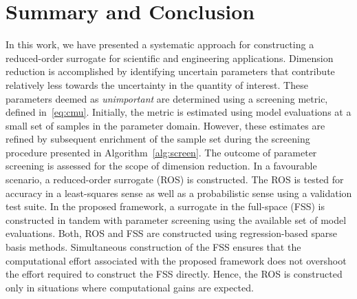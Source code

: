 \section{Summary and Conclusion}
\label{sec:disc}


In this work, we have presented a systematic approach for constructing a reduced-order
surrogate for scientific and engineering applications. Dimension reduction is accomplished
by identifying uncertain parameters that contribute relatively less towards the uncertainty
in the quantity of interest. These parameters deemed as \textit{unimportant} are determined
using a screening metric, defined in~\eqref{eq:cmu}. Initially, the metric is estimated
using model evaluations at a small set of samples in the parameter domain. However, these
estimates are refined by subsequent enrichment of the sample set during the screening
procedure presented in Algorithm~\ref{alg:screen}. The outcome of parameter screening is
assessed for the scope of dimension reduction. In a favourable scenario, a reduced-order
surrogate (ROS) is constructed. The ROS is tested for accuracy in a least-squares sense
as well as a probabilistic sense using a validation test suite. In the proposed framework,
a surrogate in the full-space (FSS) is constructed in tandem with parameter screening using
the available set of model evaluations. Both, ROS and FSS are
constructed using regression-based sparse basis methods. Simultaneous construction
of the FSS ensures that the computational effort associated with the proposed framework
does not overshoot the effort required to construct the FSS directly.
Hence, the ROS is constructed only in situations where computational gains are
expected. 

